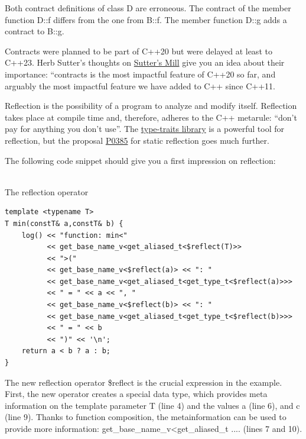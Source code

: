 Both contract definitions of class D are erroneous. The contract of the member function D::f differs from the one from B::f. The member function D::g adds a contract to B::g.

\begin{tcolorbox}[breakable,enhanced jigsaw,colback=blue!5!white,colframe=blue!75!black,title={Closing Thoughts from Herb Sutter}]
Contracts were planned to be part of C++20 but were delayed at least to C++23. Herb Sutter’s thoughts on \href{https://herbsutter.com/2018/07/02/trip-report-summer-iso-c-standards-meeting-rapperswil/}{Sutter’s Mill} give you an idea about their importance: “contracts is the most impactful feature of C++20 so far, and arguably the most impactful feature we have added to C++ since C++11.
\end{tcolorbox}


Reflection is the possibility of a program to analyze and modify itself. Reflection takes place at compile time and, therefore, adheres to the C++ metarule: “don’t pay for anything you don’t use”. The \href{https://en.cppreference.com/w/cpp/header/type_traits}{type-traits library} is a powerful tool for reflection, but the proposal \href{http://www.open-std.org/jtc1/sc22/wg21/docs/papers/2017/p0385r2.pdf}{P0385} for static reflection goes much further.

The following code snippet should give you a first impression on reflection:

\hspace*{\fill} \\ %
\noindent
The reflection operator
\begin{lstlisting}[style=styleCXX]
template <typename T>
T min(constT& a,constT& b) {
	log() << "function: min<"
		  << get_base_name_v<get_aliased_t<$reflect(T)>>
		  << ">("
		  << get_base_name_v<$reflect(a)> << ": "
		  << get_base_name_v<get_aliased_t<get_type_t<$reflect(a)>>>
		  << " = " << a << ", "
		  << get_base_name_v<$reflect(b)> << ": "
		  << get_base_name_v<get_aliased_t<get_type_t<$reflect(b)>>>
		  << " = " << b
		  << ")" << '\n';
	return a < b ? a : b;
}
\end{lstlisting}

The new reflection operator \$reflect is the crucial expression in the example. First, the new operator creates a special data type, which provides meta information on the template parameter T (line 4) and the values a (line 6), and c (line 9). Thanks to function composition, the metainformation can be used to provide more information: get\_base\_name\_v<get\_aliased\_t .... (lines 7 and 10).

